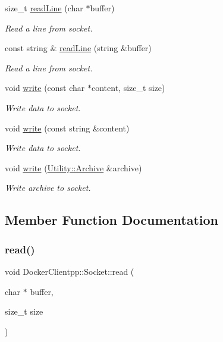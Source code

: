 \begin{DoxyCompactItemize}
size\+\_\+t \mbox{\hyperlink{classDockerClientpp_1_1Socket_a4ad626569261159c8bfe161799a3670f}{read\+Line}} (char $\ast$buffer)
\begin{DoxyCompactList}\small\item\em Read a line from socket. \end{DoxyCompactList}\item 
const string \& \mbox{\hyperlink{classDockerClientpp_1_1Socket_a169f865711e359895ece36cd2f6b95ad}{read\+Line}} (string \&buffer)
\begin{DoxyCompactList}\small\item\em Read a line from socket. \end{DoxyCompactList}\item 
void \mbox{\hyperlink{classDockerClientpp_1_1Socket_ac87760933efbd8a2d7729c45ec04df22}{write}} (const char $\ast$content, size\+\_\+t size)
\begin{DoxyCompactList}\small\item\em Write data to socket. \end{DoxyCompactList}\item 
void \mbox{\hyperlink{classDockerClientpp_1_1Socket_aea346fecc5e87835fd9d96615c0c06b6}{write}} (const string \&content)
\begin{DoxyCompactList}\small\item\em Write data to socket. \end{DoxyCompactList}\item 
void \mbox{\hyperlink{classDockerClientpp_1_1Socket_a10f23cea48507692b58489a88f30b39f}{write}} (\mbox{\hyperlink{classDockerClientpp_1_1Utility_1_1Archive}{Utility\+::\+Archive}} \&archive)
\begin{DoxyCompactList}\small\item\em Write archive to socket. \end{DoxyCompactList}\end{DoxyCompactItemize}


\subsection{Member Function Documentation}
\mbox{\label{classDockerClientpp_1_1Socket_a4251c9810d1a86c6dc95ee6ae4a870ba}} 
\subsubsection{\texorpdfstring{read()}{read()}\hspace{0.1cm}{\footnotesize\ttfamily [1/2]}}
{\footnotesize\ttfamily void Docker\+Clientpp\+::\+Socket\+::read (\begin{DoxyParamCaption}\item[{char $\ast$}]{buffer,  }\item[{size\+\_\+t}]{size }\end{DoxyParamCaption})}



